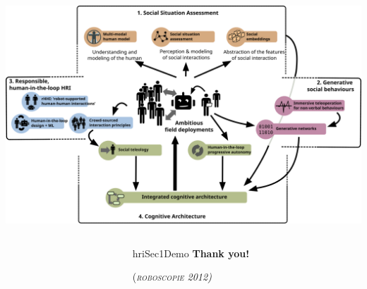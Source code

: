 \documentclass[xcolor=table]{beamer}
\begin{document}
\begin{frame}
\begin{center}
{        \includegraphics[trim=8cm 0 8cm 16cm,clip,width=\linewidth]{architectures/wps}
    }
    \end{center}
\end{frame}


{
    \begin{frame}[plain]

        \begin{columns}
            \begin{column}{0.6\linewidth}
            \end{column}
            \begin{column}{0.4\linewidth}

                \vspace{6em}
                \begin{beamercolorbox}[wd=\linewidth,ht=6ex,dp=0.7ex]{hriSec1Demo}
                    \textbf{Thank you!}
                \end{beamercolorbox}
                \vspace{12em}
                {\scriptsize
                \textcolor{white!60!black}{(\emph{\textsc{roboscopie} 2012)}}
                }
            \end{column}
        \end{columns}
    \end{frame}
}
\end{document}
